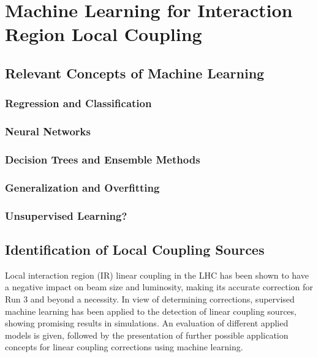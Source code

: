 \chapter{Machine Learning for Interaction Region Local Coupling} %
\label{chapter:ml_local_coupling} %


\section{Relevant Concepts of Machine Learning}

\subsection{Regression and Classification}

\subsection{Neural Networks}

\subsection{Decision Trees and Ensemble Methods}

\subsection{Generalization and Overfitting}

\subsection{Unsupervised Learning?}


\section{Identification of Local Coupling Sources}

Local interaction region (IR) linear coupling in the LHC has been shown to have a negative impact on beam size and luminosity, making its accurate correction for Run 3 and beyond a necessity.
In view of determining corrections, supervised machine learning has been applied to the detection of linear coupling sources, showing promising results in simulations.
An evaluation of different applied models is given, followed by the presentation of further possible application concepts for linear coupling corrections using machine learning.

